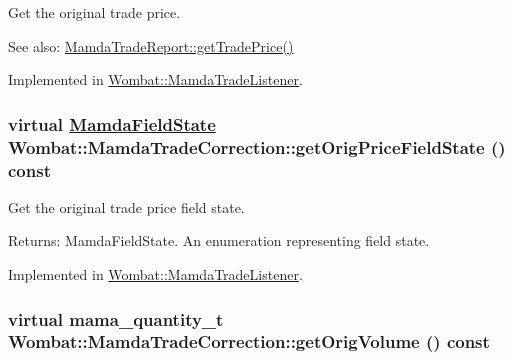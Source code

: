 Get the original trade price. 

\begin{Desc}
\item[See also:]\hyperlink{classWombat_1_1MamdaTradeReport_97a38026a45edb298ffe62530d43cde4}{Mamda\-Trade\-Report::get\-Trade\-Price()} \end{Desc}


Implemented in \hyperlink{classWombat_1_1MamdaTradeListener_7550297d285f7e2ab6b6e7060ed28f74}{Wombat::Mamda\-Trade\-Listener}.\hypertarget{classWombat_1_1MamdaTradeCorrection_92204206fdf0c2a7f86aab54305ff571}{
\subsubsection[getOrigPriceFieldState]{\setlength{\rightskip}{0pt plus 5cm}virtual \hyperlink{namespaceWombat_93aac974f2ab713554fd12a1fa3b7d2a}{Mamda\-Field\-State} Wombat::Mamda\-Trade\-Correction::get\-Orig\-Price\-Field\-State () const}}
\label{classWombat_1_1MamdaTradeCorrection_92204206fdf0c2a7f86aab54305ff571}


Get the original trade price field state. 

\begin{Desc}
\item[Returns:]Mamda\-Field\-State. An enumeration representing field state. \end{Desc}


Implemented in \hyperlink{classWombat_1_1MamdaTradeListener_63ccde5fa2b5725b0b1c4efb0ef70880}{Wombat::Mamda\-Trade\-Listener}.\hypertarget{classWombat_1_1MamdaTradeCorrection_6edddd525ed1c6875e7d39f1e3d391f8}{
\subsubsection[getOrigVolume]{\setlength{\rightskip}{0pt plus 5cm}virtual mama\_\-quantity\_\-t Wombat::Mamda\-Trade\-Correction::get\-Orig\-Volume () const}}
\label{classWombat_1_1MamdaTradeCorrection_6edddd525ed1c6875e7d39f1e3d391f8}


